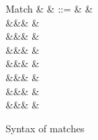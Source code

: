 \begin{figure}
\begin{syntaxfig}
\mbox{Match}
&
\xi
&
::=
&
&
\\
&&&
\matchUnit{\matchHole{}}
&
\\
&&&
\matchSum{\xi}{\sigma}
&
\\
&&&
\matchSumLL{\xi}
&
\\
&&&
\matchSumRR{\xi}
&
\\
&&&
\matchSum{\sigma}{\xi}
&
\\
&&&
&
\\
&&&
\matchRoll{\xi}
&
\end{syntaxfig}
\caption{Syntax of matches}
\end{figure}
